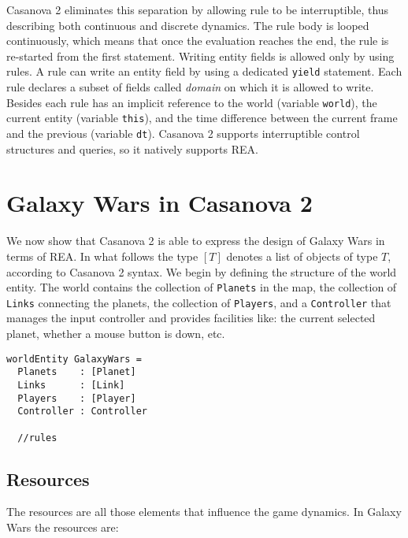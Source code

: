Casanova 2 eliminates this separation by allowing rule to be interruptible, thus describing both continuous and discrete dynamics. The rule body is looped continuously, which means that once the evaluation reaches the end, the rule is re-started from the first statement. Writing entity fields is allowed only by using rules. A rule can write an entity field by using a dedicated \texttt{yield} statement. Each rule declares a subset of fields called \textit{domain} on which it is allowed to write. Besides each rule has an implicit reference to the world (variable \texttt{world}), the current entity (variable \texttt{this}), and the time difference between the current frame and the previous (variable \texttt{dt}). Casanova 2 supports interruptible control structures and queries, so it natively supports REA.

\section{Galaxy Wars in Casanova 2}
We now show that Casanova 2 is able to express the design of Galaxy Wars in terms of REA. In what follows the type $[T]$ denotes a list of objects of type $T$, according to Casanova 2 syntax. We begin by defining the structure of the world entity. The world contains the collection of \texttt{Planets} in the map, the collection of \texttt{Links} connecting the planets, the collection of \texttt{Players}, and a \texttt{Controller} that manages the input controller and provides facilities like: the current selected planet, whether a mouse button is down, etc.

\begin{lstlisting}
worldEntity GalaxyWars =
  Planets    : [Planet]
  Links      : [Link]
  Players    : [Player]
  Controller : Controller
  
  //rules
\end{lstlisting}



\subsection{Resources}
The resources are all those elements that influence the game dynamics. In Galaxy Wars the resources are: 

